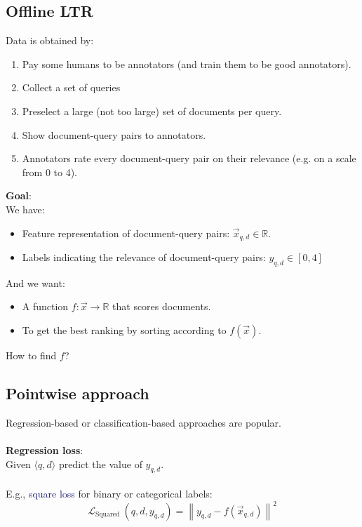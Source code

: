 \subsection{Offline LTR}
Data is obtained by:
\begin{enumerate}
\setlength\itemsep{0em}
    \item Pay some humans to be annotators (and train them to be good annotators).
    \item Collect a set of queries
    \item Preselect a large (not too large) set of documents per query.
    \item Show document-query pairs to annotators.
    \item Annotators rate every document-query pair on their relevance (e.g. on a scale from 0 to 4).
\end{enumerate}

\textbf{Goal}: \\
We have:
\begin{itemize}
\setlength\itemsep{0em}
    \item Feature representation of document-query pairs: $\vec{x}_{q,d} \in \mathbb{R}$.
    \item Labels indicating the relevance of document-query pairs: $y_{q,d} \in [0,4]$
\end{itemize}

And we want:
\begin{itemize}
\setlength\itemsep{0em}
    \item A function $f: \vec{x} \rightarrow \mathbb{R}$ that scores documents.
    \item To get the best ranking by sorting according to $f(\vec{x})$.
\end{itemize}

How to find $f$?

\subsection{Pointwise approach}
Regression-based or classification-based approaches are popular. \\
\\
\textbf{Regression loss}: \\
Given $\langle q, d\rangle$ predict the value of $y_{q,d}$. \\
\\
E.g., \textcolor{MidnightBlue}{square loss} for binary or categorical labels:
$$ \mathcal{L}_{\text {Squared }}\left(q, d, y_{q, d}\right)=\left\|y_{q, d}-f\left(\vec{x}_{q, d}\right)\right\|^{2} $$

